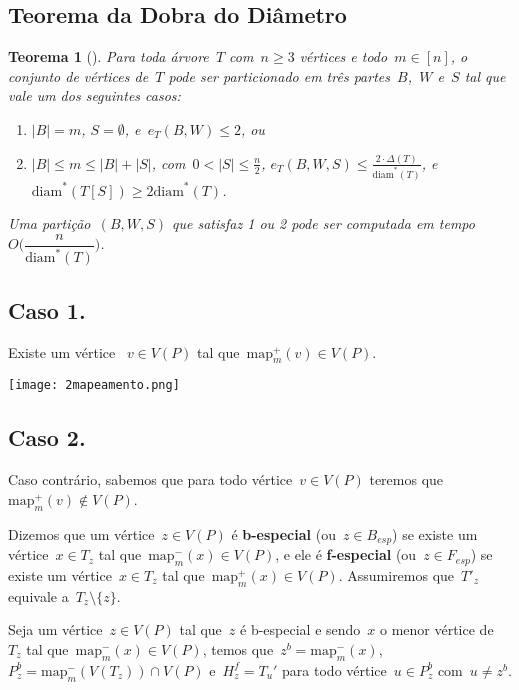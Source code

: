 \documentclass[a0,portrait]{a0poster}
\newtheorem{teo}{Teorema}
\newcommand{\diam}{\mathrm{diam}}
\newcommand{\map}{\mathrm{map}}
\begin{document}
\begin{multicols}{3}
\section*{Teorema da Dobra do Diâmetro}

\begin{teo}[]
    Para toda árvore~$T$ com~${n\ge 3}$ vértices e 
    todo~${m\in [n]}$,
    o conjunto de vértices de~$T$ pode ser particionado em 
    três partes~$B$,~$W$ e~$S$ tal que vale um dos 
    seguintes casos:
    \begin{enumerate}
    \item ${|B|=m}$, ${S=\emptyset}$, e~${e_T(B,W)\le 2}$, ou
    \item ${|B|\le m\le |B|+|S|}$, 
    com~${0<|S|\le\frac{n}{2}}$,
    ${e_T(B,W,S)\le \frac{2\cdot 
    \Delta(T)}{\diam^*(T)}}$, 
    e~${\diam^*(T[S])\ge 2\diam^*(T)}$.
    \end{enumerate}
    Uma partição~$(B,W,S)$ que satisfaz 1 ou 2 pode ser
    computada em tempo~${O\Big(\dfrac{n}{\diam^*(T)}\Big)}$.
\end{teo}


\subsection*{Caso 1.}
    Existe um vértice ~${v\in V(P)}$ tal 
    que~${\map_m^+(v)\in V(P)}$.
\begin{center}
\texttt{[image: 2mapeamento.png]}
\end{center}

\subsection*{Caso 2.}
    Caso contrário, sabemos que para todo vértice~${v\in V(P)}$
    teremos que~${\map_m^+(v)\not\in V(P)}$.

    Dizemos que um vértice~${z\in V(P)}$ é \textbf{b-especial}
    (ou~${z\in B_{esp}}$)
    se existe um vértice~${x\in T_z}$ tal 
    que~${\map^{-}_m(x)\in V(P)}$, e ele é
    \textbf{f-especial} (ou~${z\in F_{esp}}$) 
    se existe um vértice~${x\in T_z}$
    tal que~${\map^{+}_m(x)\in V(P)}$.
    Assumiremos que~$T'_z$ equivale a~$T_z\setminus \{z\}$.

    \bigskip
    \bigskip

    Seja um vértice~${z\in V(P)}$ tal que~$z$ é b-especial e
    sendo~$x$ o menor vértice de~$T_z$ tal 
    que~${\map^-_m(x)\in V(P)}$, temos 
    que~${z^b = \map^-_m(x)}$,
    ~${P_z^b = \map^-_m(V(T_z))\cap V(P)}$
    e~${H_z^f =T_u'}$ para todo 
    vértice~${u\in P_z^b}$ com~${u\ne z^b}$.


\end{multicols}
\end{document}
